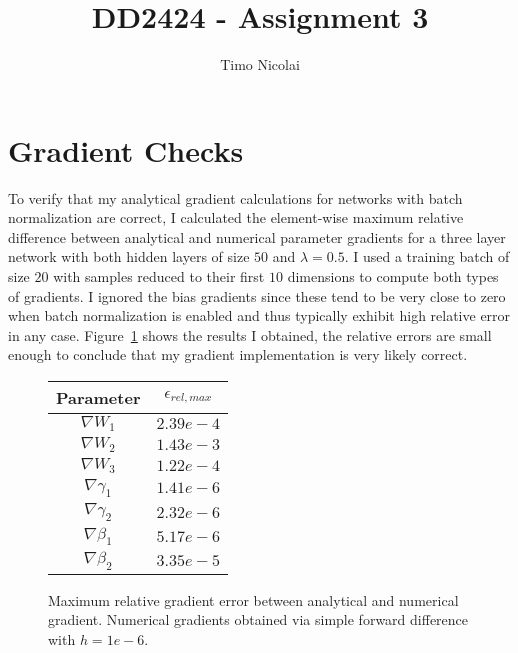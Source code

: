 \documentclass{article}
\begin{document}
\title{DD2424 - Assignment 3}
\author{Timo Nicolai}

\maketitle

\section{Gradient Checks}

To verify that my analytical gradient calculations for networks with batch
normalization are correct, I calculated the element-wise maximum relative
difference between analytical and numerical parameter gradients for a three
layer network with both hidden layers of size $50$ and $\lambda = 0.5$. I used
a training batch of size $20$ with samples reduced to their first $10$
dimensions to compute both types of gradients. I ignored the bias gradients
since these tend to be very close to zero when batch normalization is enabled
and thus typically exhibit high relative error in any case.
Figure~\ref{fig:gradients} shows the results I obtained, the relative errors
are small enough to conclude that my gradient implementation is very likely
correct.

\begin{figure}[H]
  \centering
    \begin{tabular}{|c|c|}
    \hline
    Parameter         & $\epsilon_{rel,max}$ \\
    \hline
    $\nabla W_1$      & $2.39e-4$            \\
    \hline
    $\nabla W_2$      & $1.43e-3$            \\
    \hline
    $\nabla W_3$      & $1.22e-4$            \\
    \hline
    $\nabla \gamma_1$ & $1.41e-6$            \\
    \hline
    $\nabla \gamma_2$ & $2.32e-6$            \\
    \hline
    $\nabla \beta_1$  & $5.17e-6$            \\
    \hline
    $\nabla \beta_2$  & $3.35e-5$            \\
    \hline
    \end{tabular}
  \caption{Maximum relative gradient error between analytical and numerical
           gradient. Numerical gradients obtained via simple forward difference
           with $h = 1e-6$.}
  \label{fig:gradients}
\end{figure}
\end{document}
